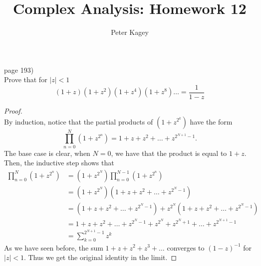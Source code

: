 \documentclass{article}
\newenvironment{problem}[2][Problem]{\begin{trivlist}
\item[\hskip \labelsep {\bfseries #1}\hskip \labelsep {\bfseries #2.}]}{\end{trivlist}}
\begin{document}
\title{Complex Analysis: Homework 12}
\author{Peter Kagey}

\maketitle

\begin{problem}{2} (page 193) \\
  Prove that for $|z| < 1$ \[
    (1 + z)(1 + z^2)(1 + z^4)(1 + z^8)\hdots = \frac{1}{1 - z}
  \]
\end{problem}
\begin{proof} \text{} \\
  By induction, notice that the partial products of $(1 + z^{2^k})$ have the
  form \[
    \prod_{n = 0}^N \left(1 + z^{2^n}\right) =
    1 + z + z^2 + \hdots + z^{2^{N+1}-1}.
  \]
  The base case is clear, when $N = 0$, we have that the product is equal to
  $1 + z$.
  Then, the inductive step shows that \begin{align*}
    \prod_{n = 0}^N \left(1 + z^{2^n}\right)
    &= \left(1 + z^{2^N}\right)\prod_{n = 0}^{N - 1} \left(1 + z^{2^n}\right) \\
    &= \left(1 + z^{2^N}\right)\left(1 + z + z^2 + \hdots + z^{2^N-1}\right) \\
    &= \left(1 + z + z^2 + \hdots + z^{2^N-1}\right) + z^{2^N}\left(1 + z + z^2 + \hdots + z^{2^N-1}\right) \\
    &= 1 + z + z^2 + \hdots + z^{2^N-1} + z^{2^N} + z^{2^N + 1} + \hdots + z^{2^{N + 1}-1} \\
    &= \sum_{k = 0}^{2^{N+1}-1} z^k
  \end{align*}
  As we have seen before, the sum $1 + z + z^2 + z^3 + \hdots$ converges to
  $(1-z)^{-1}$ for $|z| < 1$. Thus we get the original identity in the limit.
\end{proof}
\pagebreak
\end{document}

